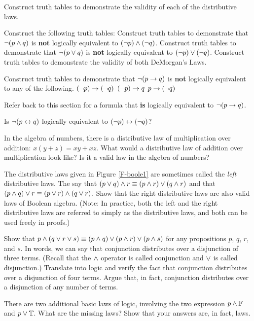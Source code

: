 \begin{exercises}

\problem Construct truth tables to demonstrate the validity of
each of the distributive laws.

\problem Construct the following truth tables:
\ppart Construct truth tables to demonstrate that $\lnot (p \wedge q)$ is {\bf not}
logically equivalent to $(\lnot p) \wedge (\lnot q)$.
\ppart Construct truth tables to demonstrate that $\lnot (p \vee q)$ is {\bf not}
logically equivalent to $(\lnot p) \vee (\lnot q)$. 
\ppart Construct truth tables to demonstrate the validity of both
DeMorgan's Laws.

\problem Construct truth tables to demonstrate that $\lnot(p\rightarrow q)$ is {\bf not}
logically equivalent to any of the following.
\ppart $(\lnot p) \rightarrow (\lnot q)$
\ppart $(\lnot p) \rightarrow q$
\ppart $p \rightarrow (\lnot q)$

Refer back to this section for a formula that {\bf is} logically equivalent to
$\lnot(p\rightarrow q)$.

\problem Is $\lnot(p\leftrightarrow q)$ 
logically equivalent to $(\lnot p) \leftrightarrow (\lnot q)$?

\problem In the algebra of numbers, there is a distributive
law of multiplication over addition:  $x(y+z)=xy+xz$.
What would a distributive law of addition over multiplication
look like?  Is it a valid law in the algebra of numbers?

\problem The distributive laws given in Figure \ref{F-boole1} are sometimes
called the \emph{left} distributive laws.  The  say that $(p\vee q)\wedge r\equiv (p\wedge r)\vee (q\wedge r)$ and
that $(p\wedge q)\vee r\equiv (p\vee r)\wedge (q \vee r)$.  Show that
the right distributive laws are also valid laws of Boolean algebra.
(Note: In practice, both the left and the right distributive laws
are referred to simply as the distributive laws, and both can be used
freely in proofs.)

\problem Show that $p\wedge(q\vee r\vee s)\equiv (p\wedge q)\vee(p\wedge r)\vee
(p\wedge s)$ for any propositions $p$, $q$, $r$, and $s$.  In words, 
we can say that conjunction distributes over a disjunction of
three terms.  (Recall that the $\wedge$ operator is called conjunction and $\vee$
is called disjunction.)
Translate into logic and verify the fact that
conjunction distributes over a disjunction of four terms.  Argue that,
in fact, conjunction distributes over a disjunction of any number
of terms.

\problem There are two additional basic laws of logic, involving the
two expression $p\wedge\mathbb{F}$ and $p\vee\mathbb{T}$.  What are the missing laws?
Show that your answers are, in fact, laws.


\end{exercises}
